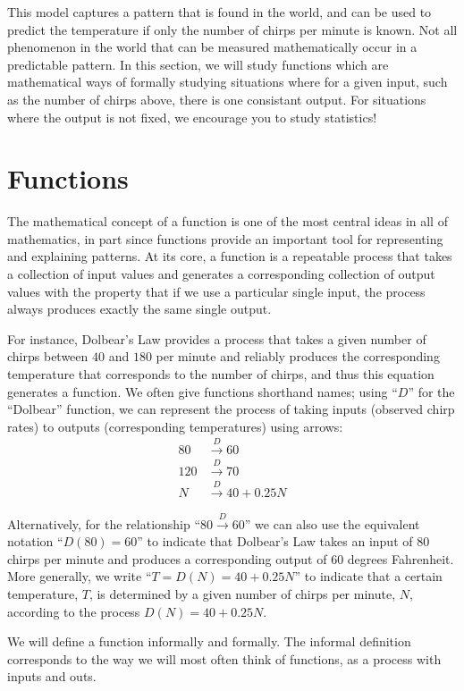 \documentclass{ximera}
\begin{document}
This model captures a pattern that is found in the world, and can be used to predict the temperature if only the number of chirps per minute is known.  Not all phenomenon in the world that can be measured mathematically occur in a predictable pattern.  In this section, we will study functions which are mathematical ways of formally studying situations where for a given input, such as the number of chirps above, there is one consistant output.  For situations where the output is not fixed, we encourage you to study statistics!

\section{Functions}
The mathematical concept of a function is one of the most central ideas in all of mathematics, in part since functions provide an important tool for representing and explaining patterns.  At its core, a function is a repeatable process that takes a collection of input values and generates a corresponding collection of output values with the property that if we use a particular single input, the process always produces exactly the same single output.

For instance, Dolbear's Law provides a process that takes a given number of chirps between $40$ and $180$ per minute and reliably produces the corresponding temperature that corresponds to the number of chirps, and thus this equation generates a function.  We often give functions shorthand names; using ``$D$'' for the ``Dolbear'' function, we can represent the process of taking inputs (observed chirp rates) to outputs (corresponding temperatures) using arrows:%
\begin{align*}
80 &\xrightarrow{D} 60\\
120 &\xrightarrow{D} 70\\
N &\xrightarrow{D} 40 + 0.25 N
\end{align*}

Alternatively, for the relationship ``$80 \xrightarrow{D} 60$'' we can also use the equivalent notation ``$D(80) = 60$'' to indicate that Dolbear's Law takes an input of $80$ chirps per minute and produces a corresponding output of $60$ degrees Fahrenheit.  More generally, we write ``$T = D(N) = 40 + 0.25N$'' to indicate that a certain temperature, $T$, is determined by a given number of chirps per minute, $N$, according to the process $D(N) = 40 + 0.25N$.


We will define a function informally and formally.  The informal definition corresponds to the way we will most often think of functions, as a process with inputs and outs.  
\end{document}
